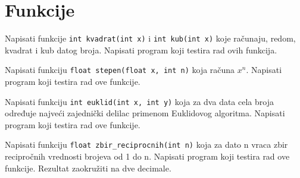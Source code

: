 \section{Funkcije}

\begin{Exercise}[label=v1.4_01] 
Napisati funkcije
\verb|int kvadrat(int x)| i \verb|int kub(int x)|
koje računaju, redom,  kvadrat i kub datog broja. Napisati program koji testira rad ovih funkcija.\\ 
\end{Exercise}
\begin{Answer}[ref=v1.4_01]
\end{Answer}

\begin{Exercise}[label=v1.4_02] 
Napisati funkciju
\verb|float stepen(float x, int n)|
koja računa $x^n$. Napisati program koji testira rad ove funkcije.\\ 
\end{Exercise}
\begin{Answer}[ref=v1.4_02]
\end{Answer}

\begin{Exercise}[label=v1.4_03] 
Napisati funkciju 
\verb|int euklid(int x, int y)|
koja za dva data cela broja određuje
  najveći zajednički delilac primenom Euklidovog algoritma. Napisati program
  koji testira rad ove funkcije.\\ 
\end{Exercise}
\begin{Answer}[ref=v1.4_03]
\end{Answer}

\begin{Exercise}[label=v1.4_04] 
Napisati funkciju 
\verb|float zbir_reciprocnih(int n)|
koja za dato n vraca zbir recipročnih vrednosti brojeva od 1 do n.
Napisati program koji testira rad ove funkcije. Rezultat zaokružiti
na dve decimale.\\ 
\end{Exercise}
\begin{Answer}[ref=v1.4_04]
\end{Answer}

